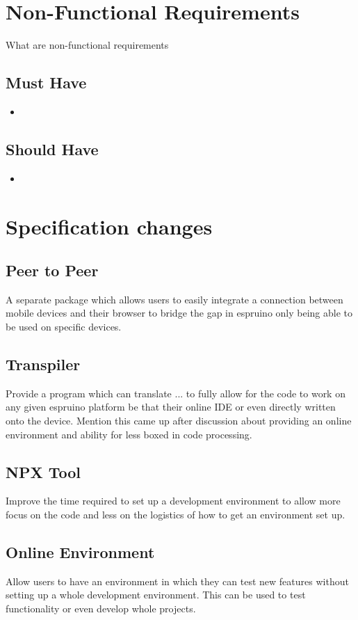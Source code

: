 \documentclass{l4proj}
\begin{document}
\section{Non-Functional Requirements}
\text What are non-functional requirements
\subsection{Must Have}
\begin{itemize}
    \item 
    
\end{itemize} 
\subsection{Should Have}
\begin{itemize}
    \item 
\end{itemize} 

\section{Specification changes}
\subsection{Peer to Peer}
\text A separate package which allows users to easily integrate a connection between mobile devices and their browser to bridge the gap in espruino only being able to be used on specific devices.

\subsection{Transpiler}
\text Provide a program which can translate ... to fully allow for the code to work on any given espruino platform be that their online IDE or even directly written onto the device. Mention this came up after discussion about providing an online environment and ability for less boxed in code processing.

\subsection{NPX Tool}
\text Improve the time required to set up a development environment to allow more focus on the code and less on the logistics of how to get an environment set up.

\subsection{Online Environment}
\text Allow users to have an environment in which they can test new features without setting up a whole development environment. This can be used to test functionality or even develop whole projects.
\end{document}
